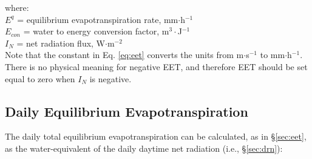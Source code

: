 \noindent where:\\
\indent $E^q$ = equilibrium evapotranspiration rate, mm$\cdot$h$^{-1}$\\
\indent $E_{con}$ = water to energy conversion factor, m$^{3}\cdot$J$^{-1}$\\
\indent $I_N$ = net radiation flux, W$\cdot$m$^{-2}$ \\

\noindent Note that the constant in Eq. \ref{eq:eet} converts the units from m$\cdot$s$^{-1}$ to mm$\cdot$h$^{-1}$. 
There is no physical meaning for negative EET, and therefore EET should be set equal to zero when $I_N$ is negative. 

\subsection{Daily Equilibrium Evapotranspiration}
\label{sec:deet}
The daily total equilibrium evapotranspiration can be calculated, as in \S \ref{sec:eet}, as the water-equivalent of the daily daytime net radiation (i.e., \S \ref{sec:drn}):

